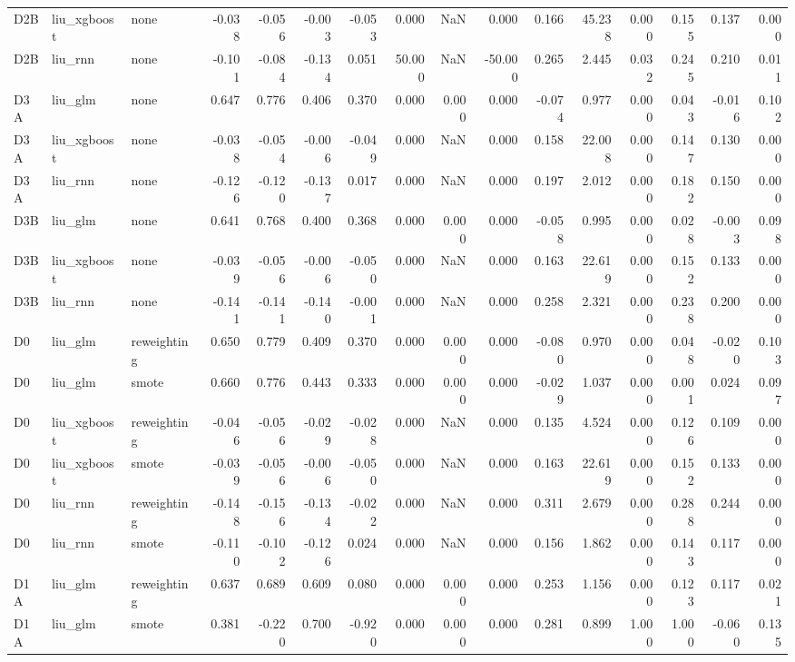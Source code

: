 \begin{tabular}{lllrrrrrrrrrrrrr}
D2B & liu_xgboost & none & -0.038 & -0.056 & -0.003 & -0.053 & 0.000 & NaN & 0.000 & 0.166 & 45.238 & 0.000 & 0.155 & 0.137 & 0.000 \\
D2B & liu_rnn & none & -0.101 & -0.084 & -0.134 & 0.051 & 50.000 & NaN & -50.000 & 0.265 & 2.445 & 0.032 & 0.245 & 0.210 & 0.011 \\
D3A & liu_glm & none & 0.647 & 0.776 & 0.406 & 0.370 & 0.000 & 0.000 & 0.000 & -0.074 & 0.977 & 0.000 & 0.043 & -0.016 & 0.102 \\
D3A & liu_xgboost & none & -0.038 & -0.054 & -0.006 & -0.049 & 0.000 & NaN & 0.000 & 0.158 & 22.008 & 0.000 & 0.147 & 0.130 & 0.000 \\
D3A & liu_rnn & none & -0.126 & -0.120 & -0.137 & 0.017 & 0.000 & NaN & 0.000 & 0.197 & 2.012 & 0.000 & 0.182 & 0.150 & 0.000 \\
D3B & liu_glm & none & 0.641 & 0.768 & 0.400 & 0.368 & 0.000 & 0.000 & 0.000 & -0.058 & 0.995 & 0.000 & 0.028 & -0.003 & 0.098 \\
D3B & liu_xgboost & none & -0.039 & -0.056 & -0.006 & -0.050 & 0.000 & NaN & 0.000 & 0.163 & 22.619 & 0.000 & 0.152 & 0.133 & 0.000 \\
D3B & liu_rnn & none & -0.141 & -0.141 & -0.140 & -0.001 & 0.000 & NaN & 0.000 & 0.258 & 2.321 & 0.000 & 0.238 & 0.200 & 0.000 \\
D0 & liu_glm & reweighting & 0.650 & 0.779 & 0.409 & 0.370 & 0.000 & 0.000 & 0.000 & -0.080 & 0.970 & 0.000 & 0.048 & -0.020 & 0.103 \\
D0 & liu_glm & smote & 0.660 & 0.776 & 0.443 & 0.333 & 0.000 & 0.000 & 0.000 & -0.029 & 1.037 & 0.000 & 0.001 & 0.024 & 0.097 \\
D0 & liu_xgboost & reweighting & -0.046 & -0.056 & -0.029 & -0.028 & 0.000 & NaN & 0.000 & 0.135 & 4.524 & 0.000 & 0.126 & 0.109 & 0.000 \\
D0 & liu_xgboost & smote & -0.039 & -0.056 & -0.006 & -0.050 & 0.000 & NaN & 0.000 & 0.163 & 22.619 & 0.000 & 0.152 & 0.133 & 0.000 \\
D0 & liu_rnn & reweighting & -0.148 & -0.156 & -0.134 & -0.022 & 0.000 & NaN & 0.000 & 0.311 & 2.679 & 0.000 & 0.288 & 0.244 & 0.000 \\
D0 & liu_rnn & smote & -0.110 & -0.102 & -0.126 & 0.024 & 0.000 & NaN & 0.000 & 0.156 & 1.862 & 0.000 & 0.143 & 0.117 & 0.000 \\
D1A & liu_glm & reweighting & 0.637 & 0.689 & 0.609 & 0.080 & 0.000 & 0.000 & 0.000 & 0.253 & 1.156 & 0.000 & 0.123 & 0.117 & 0.021 \\
D1A & liu_glm & smote & 0.381 & -0.220 & 0.700 & -0.920 & 0.000 & 0.000 & 0.000 & 0.281 & 0.899 & 1.000 & 1.000 & -0.060 & 0.135 \\

\end{tabular}
